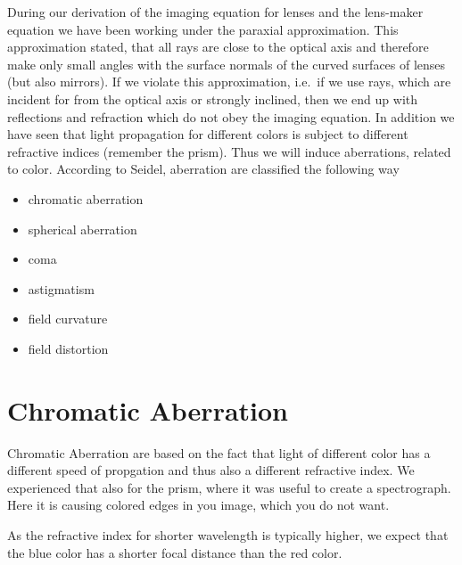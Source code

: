 \documentclass[
  a4paper,
]{book}
\providecommand{\tightlist}{%
  \setlength{\itemsep}{0pt}\setlength{\parskip}{0pt}}
\begin{document}
During our derivation of the imaging equation for lenses and the
lens-maker equation we have been working under the paraxial
approximation. This approximation stated, that all rays are close to the
optical axis and therefore make only small angles with the surface
normals of the curved surfaces of lenses (but also mirrors). If we
violate this approximation, i.e.~if we use rays, which are incident for
from the optical axis or strongly inclined, then we end up with
reflections and refraction which do not obey the imaging equation. In
addition we have seen that light propagation for different colors is
subject to different refractive indices (remember the prism). Thus we
will induce aberrations, related to color. According to Seidel,
aberration are classified the following way

\begin{itemize}
\tightlist
\item
  chromatic aberration
\item
  spherical aberration
\item
  coma
\item
  astigmatism
\item
  field curvature
\item
  field distortion
\end{itemize}

\section{Chromatic Aberration}\label{chromatic-aberration}

Chromatic Aberration are based on the fact that light of different color
has a different speed of propgation and thus also a different refractive
index. We experienced that also for the prism, where it was useful to
create a spectrograph. Here it is causing colored edges in you image,
which you do not want.

As the refractive index for shorter wavelength is typically higher, we
expect that the blue color has a shorter focal distance than the red
color.
\end{document}
